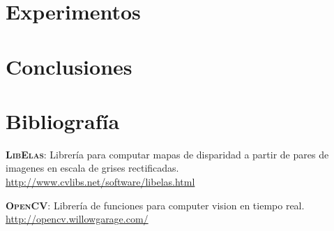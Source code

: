 \documentclass[journal,a4paper]{IEEEtran}
\newcommand{\tit}[1]{\textsc{\textbf{#1}}}
\begin{document}
\section{Experimentos}

\section{Conclusiones}

\section{Bibliografía}

\tit{LibElas}: Librería para computar mapas de disparidad a partir de pares de imagenes en escala de grises rectificadas. \url{http://www.cvlibs.net/software/libelas.html}

\bigskip

\tit{OpenCV}: Librería de funciones para computer vision en tiempo real. \url{http://opencv.willowgarage.com/}
\end{document}
